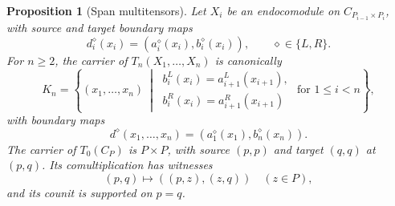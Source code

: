 \documentclass[oneside]{article}
\theoremstyle{plain}
\newtheorem{proposition}[theorem]{Proposition}
\theoremstyle{definition}
\theoremstyle{remark}
\begin{document}
\begin{proposition}[Span multitensors]
\label{prop:cgqg-background-span-multitensors}
Let \(X_i\) be an endocomodule on \(C_{P_{i-1}\times P_i}\), with
source and target boundary maps
\[
 d_i^{\diamond}(x_i)=(a_i^{\diamond}(x_i),b_i^{\diamond}(x_i)),\qquad\diamond\in\{L,R\}.
\]
For \(n\geq2\), the carrier of \(T_n(X_1,\ldots,X_n)\) is canonically
\begin{equation}
 K_n=
 \left\{(x_1,\ldots,x_n)\ \middle|\
 \begin{array}{l}
 b_i^{L}(x_i)=a_{i+1}^{L}(x_{i+1}),\\
 b_i^{R}(x_i)=a_{i+1}^{R}(x_{i+1})
 \end{array}
 \text{ for }1\leq i<n\right\},
 \label{eq:cgqg-background-span-multitensor}
\end{equation}
with boundary maps
\[
 d^{\diamond}(x_1,\ldots,x_n)
   =(a_1^{\diamond}(x_1),b_n^{\diamond}(x_n)).
\]
The carrier of \(T_0(C_P)\) is \(P\times P\), with source
\((p,p)\) and target \((q,q)\) at \((p,q)\). Its comultiplication has
witnesses
\begin{equation}
 (p,q)\longmapsto((p,z),(z,q))\quad(z\in P),
 \label{eq:cgqg-background-nullary-comultiplication}
\end{equation}
and its counit is supported on \(p=q\).
\end{proposition}
\end{document}

